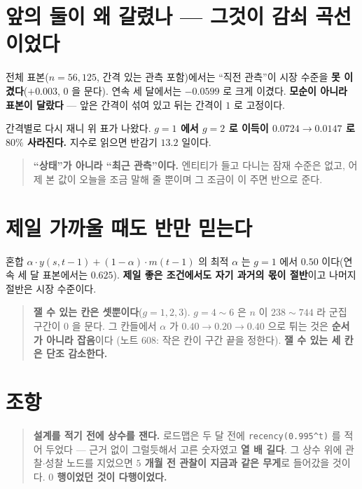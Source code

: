 \documentclass[11pt]{article}
\begin{document}
\section{앞의 둘이 왜 갈렸나 --- 그것이 감쇠 곡선이었다}

전체 표본($n{=}56{,}125$, 간격 있는 관측 포함)에서는 ``직전 관측''이 시장
수준을 \textbf{못 이겼다}($+0.003$, $0$ 을 문다). 연속 세 달에서는
$-0.0599$ 로 크게 이겼다. \textbf{모순이 아니라 표본이 달랐다} --- 앞은
간격이 섞여 있고 뒤는 간격이 $1$ 로 고정이다.

간격별로 다시 재니 위 표가 나왔다. \textbf{$g{=}1$ 에서 $g{=}2$ 로 이득이
$0.0724 \to 0.0147$ 로 $80\%$ 사라진다.} 지수로 읽으면 반감기
$\mathbf{13.2}$ 일이다.

\begin{quote}
\textbf{``상태''가 아니라 ``최근 관측''이다.} 엔티티가 들고 다니는 잠재
수준은 없고, 어제 본 값이 오늘을 조금 말해 줄 뿐이며 그 조금이 이 주면
반으로 준다.
\end{quote}

\section{제일 가까울 때도 반만 믿는다}

혼합 $\alpha \cdot y(s,t{-}1) + (1-\alpha) \cdot m(t{-}1)$ 의 최적
$\alpha$ 는 $g{=}1$ 에서 \textbf{$0.50$} 이다(연속 세 달 표본에서는
$0.625$). \textbf{제일 좋은 조건에서도 자기 과거의 몫이 절반}이고 나머지
절반은 시장 수준이다.

\begin{quote}
\textbf{잴 수 있는 칸은 셋뿐이다}($g{=}1,2,3$). $g{=}4\!\sim\!6$ 은
$n$ 이 $238\!\sim\!744$ 라 군집 구간이 $0$ 을 문다. 그 칸들에서 $\alpha$ 가
$0.40 \to 0.20 \to 0.40$ 으로 튀는 것은 \textbf{순서가 아니라 잡음}이다
(노트 $608$: 작은 칸이 구간 끝을 정한다). \textbf{잴 수 있는 세 칸은
단조 감소한다.}
\end{quote}

\section*{조항}

\begin{quote}
\textbf{설계를 적기 전에 상수를 잰다.} 로드맵은 두 달 전에
\texttt{recency(0.995\^{}t)} 를 적어 두었다 --- 근거 없이 그럴듯해서 고른
숫자였고 \textbf{열 배 길다}. 그 상수 위에 관찰$\cdot$성찰 노드를
지었으면 \textbf{$5$ 개월 전 관찰이 지금과 같은 무게}로 들어갔을 것이다.
\textbf{$0$ 행이었던 것이 다행이었다.}
\end{quote}
\end{document}
